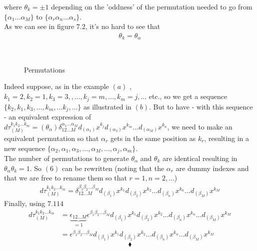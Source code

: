 where $\theta_{k}= \pm 1$ depending on the 'oddness' of the permutation needed to go from $\{\alpha_1\dots \alpha_M\}$ to $\{\alpha_r\alpha_n \dots \alpha_s\}$.\\
As we can see in figure $7.2$,  it's no hard to see that 
\begin{align}
\theta_{k}=\theta_{\alpha}
\end{align}
\begin{figure}[H]%
    \centering
    \subfloat[]{}\\
    \subfloat[]{}
\caption{Permutations}
\label{fig:fig_p255}
\end{figure}
Indeed suppose, as in the example $(a)$ ,  $k_1=2, k_2=1,k_3=3, ,\dots ,k_j = m,\dots , k_m=j,\dots$ etc., so we get a sequence $\{k_2, k_1,k_3,\dots, k_m,\dots k_j,\dots\}$ as illustrated in $(b)$. But to have - with this sequence - an equivalent expression of 
$d\tau_{(M)}^{k_1 k_2\dots k_m}=(\theta_{\alpha}) \delta_{1 2 \dots M}^{\alpha_1\dots \alpha_M}d_{(\alpha_1)}x^{k_j}d_{(\alpha_2)}x^{k_m}\dots d_{(\alpha_M)}x^{k_n}$, we need to make an equivalent permutation so that $\alpha_r$ gets in the same position  as $k_r$, resulting in a new sequence $\{\alpha_2,\alpha_1,\alpha_3,\dots,\alpha_M,\dots,\alpha_j, \alpha_m\}$.\\
The number of permutations to generate $\theta_{\alpha}$ and $\theta_k$ are identical resulting in $\theta_{\alpha}\theta_k=1$.
So $(6)$ can be rewritten (noting that the $\alpha_r$ are dummy indexes and that we are free to rename them so that $r=1, n=2,\dots$) 
\begin{align*}
d\tau_{(M)}^{k_1 k_2\dots k_m}= \delta_{1 2 \dots M}^{\beta_1\beta_2 \dots \beta_M}d_{(\beta_1)}x^{k_1}d_{(\beta_2)}x^{k_2}\dots d_{(\beta_n)}x^{k_n}\dots d_{(\beta_M)}x^{k_M}
\end{align*}
Finally, using $\mathbf{7.114}$ 
\begin{align*}
d\tau_{(M)}^{k_1 k_2\dots k_m}&= \underbrace{\epsilon_{1 2 \dots M}}_{=1}\epsilon^{\beta_1\beta_2 \dots \beta_M}d_{(\beta_1)}x^{k_1}d_{(\beta_2)}x^{k_2}\dots d_{(\beta_n)}x^{k_n}\dots d_{(\beta_M)}x^{k_M}\\
&= \epsilon^{\beta_1\beta_2 \dots \beta_M}d_{(\beta_1)}x^{k_1}d_{(\beta_2)}x^{k_2}\dots d_{(\beta_n)}x^{k_n}\dots d_{(\beta_M)}x^{k_M}
\end{align*}
$$\blacklozenge$$
\newpage


